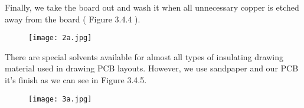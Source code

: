 Finally, we take the board out and wash it when all unnecessary copper is etched away from the board ( Figure 3.4.4 ). \hfill \break

\begin{figure}[H]
\texttt{[image: 2a.jpg]}
\centering \linebreak {}
\end{figure}

\pagebreak

There are special solvents available for almost all types of insulating drawing material used in drawing PCB layouts. However, we use sandpaper and our PCB it's finish as we can see in Figure 3.4.5. \hfill \break

\begin{figure}[H]
\texttt{[image: 3a.jpg]}
\centering \linebreak {}
\end{figure} 

\pagebreak